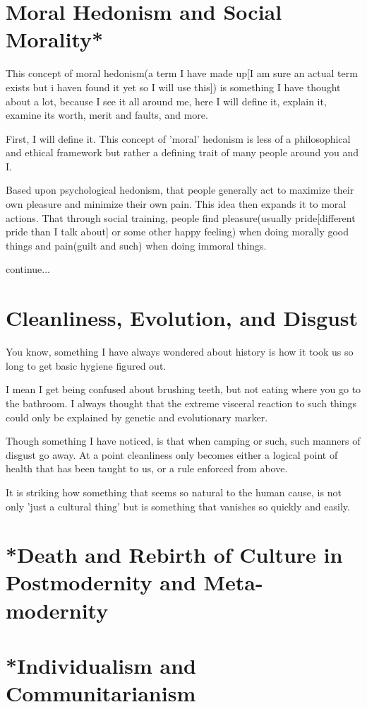 \section{Moral Hedonism and Social Morality*}
\par This concept of moral hedonism(a term I have made up[I am sure an actual term exists but i haven found it yet so I will use this]) is something I have thought about a lot, because I see it all around me, here I will define it, explain it, examine its worth, merit and faults, and more.
\par First, I will define it. This concept of 'moral' hedonism is less of a philosophical and ethical framework but rather a defining trait of many people around you and I. 
\par Based upon psychological hedonism, that people generally act to maximize their own pleasure and minimize their own pain. This idea then expands it to moral actions. That through social training, people find pleasure(usually pride[different pride than I talk about] or some other happy feeling) when doing morally good things and pain(guilt and such) when doing immoral things. 
\par continue...
\section{Cleanliness, Evolution, and Disgust}
\par You know, something I have always wondered about history is how it took us so long to get basic hygiene figured out.
\par I mean I get being confused about brushing teeth, but not eating where you go to the bathroom. I always thought that the extreme visceral reaction to such things could only be explained by genetic and evolutionary marker.
\par Though something I have noticed, is that when camping or such, such manners of disgust go away. At a point cleanliness only becomes either a logical point of health that has been taught to us, or a rule enforced from above. 
\par It is striking how something that seems so natural to the human cause, is not only 'just a cultural thing' but is something that vanishes so quickly and easily.
\section{*Death and Rebirth of Culture in Postmodernity and Meta-modernity}
\section{*Individualism and Communitarianism}
